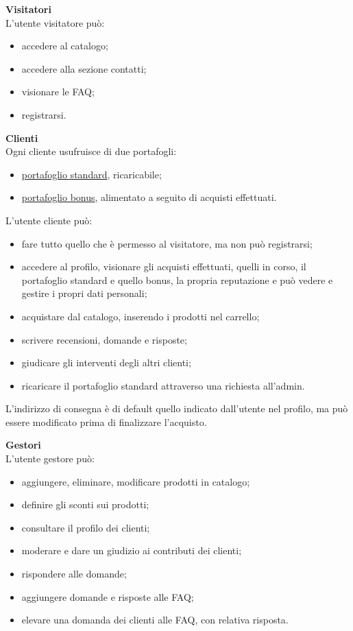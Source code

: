 \documentclass[a4paper, 14pt]{article}
\begin{document}
\begin{flushleft}
			\bigskip \textbf{Visitatori} \\ \smallskip
			L'utente visitatore può:
			\begin{itemize}
				\item accedere al catalogo;
				\item accedere alla sezione contatti;
				\item visionare le FAQ;
				\item registrarsi.
			\end{itemize}
			
			\bigskip \textbf{Clienti} \\ \smallskip
			Ogni cliente usufruisce di due portafogli:
			\begin{itemize}
				\item \underline{portafoglio standard}, ricaricabile;
				\item \underline{portafoglio bonus}, alimentato a seguito di acquisti effettuati.
			\end{itemize}
			
			L'utente cliente può:
			\begin{itemize}
				\item fare tutto quello che è permesso al visitatore, ma non può registrarsi;
				\item accedere al profilo, visionare gli acquisti effettuati, quelli in corso, il portafoglio
				standard e quello bonus, la propria reputazione e può vedere e gestire i propri dati personali;
				\item acquistare dal catalogo, inserendo i prodotti nel carrello;
				\item scrivere recensioni, domande e risposte;
				\item giudicare gli interventi degli altri clienti;
				\item ricaricare il portafoglio standard attraverso una richiesta all'admin.
			\end{itemize}
			L’indirizzo di consegna è di default quello indicato dall’utente nel profilo, ma può essere
			modificato prima di finalizzare l’acquisto.
		
			\bigskip \textbf{Gestori} \\ \smallskip
			L'utente gestore può:
			\begin{itemize}
				\item aggiungere, eliminare, modificare prodotti in catalogo;
				\item definire gli sconti sui prodotti;
				\item consultare il profilo dei clienti;
				\item moderare e dare un giudizio ai contributi dei clienti;
				\item rispondere alle domande;
				\item aggiungere domande e risposte alle FAQ;
				\item elevare una domanda dei clienti alle FAQ, con relativa risposta.
			\end{itemize}
		

\end{flushleft}
\end{document}
